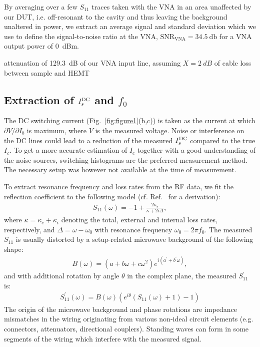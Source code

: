 By averaging over a few $S_{11}$ traces taken with the VNA in an area unaffected by our DUT, i.e. off-resonant to the cavity and thus leaving the background unaltered in power, we extract an average signal and standard deviation which we use to define the signal-to-noise ratio at the VNA, $\text{SNR}_\text{VNA}=\SI{34.5}{\decibel}$ for a VNA output power of \SI{0}{dBm}.

attenuation of \SI{129.3}{dB} of our VNA input line, assuming $X=\SI{2}{dB}$ of cable loss between sample and HEMT

\subsection{Extraction of $I_s^{\rm DC}$ and $f_0$}\label{sec:extraction}

The DC switching current (Fig.~\ref{fig:figure1}(b,c)) is taken as the current at which $\partial V/\partial I_b$ is maximum, where $V$ is the measured voltage.
%
Noise or interference on the DC lines could lead to a reduction of the measured $I_s^{\rm DC}$ compared to the true $I_c$.
%
To get a more accurate estimation of $I_c$ together with a good understanding of the noise sources, switching histograms are the preferred measurement method.
%
The necessary setup was however not available at the time of measurement.

To extract resonance frequency and loss rates from the RF data, we fit the reflection coefficient to the following model (cf. Ref.~\cite{bosmanBroadbandArchitectureGalvanically2015c} for a derivation):
%
\begin{align}
S_{11}(\omega) = -1+\frac{2\kappa_e}{\kappa+2i\Delta},
\end{align}
%
where $\kappa=\kappa_e+\kappa_i$ denoting the total, external and internal loss rates, respectively, and $\Delta=\omega-\omega_0$ with resonance frequency $\omega_0=2\pi f_0$.
%
The measured $S_{11}$ is usually distorted by a setup-related microwave background of the following shape:
\begin{align}
B(\omega) = \left(a+b\omega+c\omega^2\right)e^{i\left(a^\prime+b^\prime\omega\right)},
\end{align}
%
and with additional rotation by angle $\theta$ in the complex plane, the measured $S_{11}^\prime$ is:
\begin{align}
S_{11}^\prime(\omega)=B(\omega)\left(e^{i\theta}\left(S_{11}(\omega)+1\right)-1\right)
\end{align}
%
The origin of the microwave background and phase rotations are impedance mismatches in the wiring originating from various non-ideal circuit elements (e.g. connectors, attenuators, directional couplers).
%
Standing waves can form in some segments of the wiring which interfere with the measured signal.

